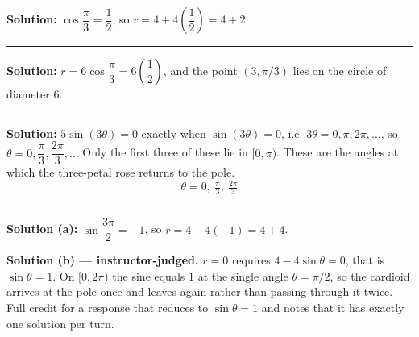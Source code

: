 \documentclass[12pt]{article}
\begin{document}




\textbf{Solution:} \quad $\cos\dfrac{\pi}{3} = \dfrac{1}{2}$, so
$r = 4 + 4\left(\dfrac{1}{2}\right) = 4 + 2$. 

\vspace{0.15cm}\noindent\rule{\linewidth}{0.2pt}\vspace{0.15cm}


\textbf{Solution:} \quad $r = 6\cos\dfrac{\pi}{3} = 6\left(\dfrac{1}{2}\right)$, and the
point $(3, \pi/3)$ lies on the circle of diameter $6$. 

\vspace{0.15cm}\noindent\rule{\linewidth}{0.2pt}\vspace{0.15cm}

\problem{Find every $\theta$ in $[0, \pi)$ for which $r = 5\sin(3\theta)$ equals zero.}

\textbf{Solution:} \quad $5\sin(3\theta) = 0$ exactly when $\sin(3\theta) = 0$, i.e.
$3\theta = 0, \pi, 2\pi, \ldots$, so $\theta = 0, \dfrac{\pi}{3}, \dfrac{2\pi}{3}, \ldots$
Only the first three of these lie in $[0, \pi)$. These are the angles at which the
three-petal rose returns to the pole.
\[ \boxed{\theta = 0, \ \tfrac{\pi}{3}, \ \tfrac{2\pi}{3}} \]

\vspace{0.15cm}\noindent\rule{\linewidth}{0.2pt}\vspace{0.15cm}


\textbf{Solution (a):} \quad $\sin\dfrac{3\pi}{2} = -1$, so $r = 4 - 4(-1) = 4 + 4$. 

\textbf{Solution (b) --- instructor-judged.} \quad $r = 0$ requires $4 - 4\sin\theta = 0$,
that is $\sin\theta = 1$. On $[0, 2\pi)$ the sine equals $1$ at the single angle
$\theta = \pi/2$, so the cardioid arrives at the pole once and leaves again rather than
passing through it twice. Full credit for a response that reduces to $\sin\theta = 1$ and
notes that it has exactly one solution per turn.
\end{document}
